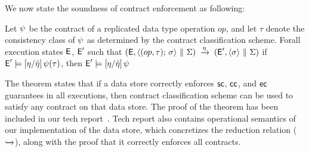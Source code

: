 

We now state the soundness of contract enforcement as following:

\begin{theorem}
\label{lem:core-preservation}
Let $\psi$ be the contract of a replicated data type operation $op$,
and let $\tau$ denote the consistency class of $\psi$
as determined by the contract classification scheme. Forall execution
states ${\normalfont \textsf{E}}$, ${\normalfont \textsf{E}}'$ such that
$({\normalfont \textsf{E}},\langle (op,\tau);\,\sigma \rangle ~\|~ \Sigma) \;\xrightarrow{\eta}\; ({\normalfont \textsf{E}}',\langle \sigma \rangle ~\|~ \Sigma)$
if ${\normalfont \textsf{E}}' \models [\eta/\hat{\eta}]\,\psi(\tau)$, then ${\normalfont \textsf{E}}' \models [\eta/\hat{\eta}]\,\psi$
\end{theorem}

The theorem states that if a data store correctly enforces ${\sf sc}$,
${\sf cc}$, and ${\sf ec}$ guarantees in all executions, then contract
classification scheme can be used to satisfy any \name contract on
that data store. The proof of the theorem has been included in our
tech report~\cite{techrep}. Tech report also contains operational
semantics of our implementation of the data store, which concretizes
the reduction relation ($\xhookrightarrow{}$), along with the proof
that it correctly enforces all \name contracts.

